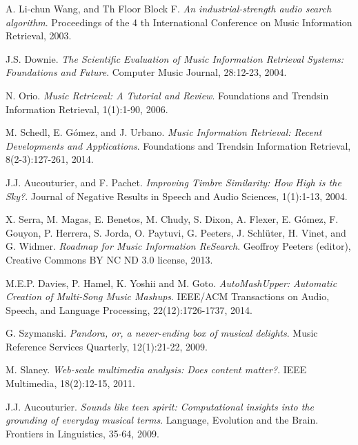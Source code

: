 \documentclass[11pt, oneside, openright]{Thesis} %
\begin{document}
\label{Bibliography}


\begin{thebibliography}{99}
A. Li-chun Wang, and Th Floor Block F. 
\textit{An industrial-strength audio search algorithm}. 
Proceedings of the 4 th International Conference on Music Information Retrieval, 2003.
 
J.S. Downie.
\textit{The Scientific Evaluation of Music Information Retrieval Systems: Foundations and Future}. 
Computer Music Journal, 28:12-23, 2004.
 
N. Orio.
\textit{Music Retrieval: A Tutorial and Review}. 
Foundations and Trends\textregistered in Information Retrieval, 1(1):1-90, 2006.

M. Schedl, E. Gómez, and J. Urbano.
\textit{Music Information Retrieval: Recent Developments and Applications}. 
Foundations and Trends\textregistered in Information Retrieval, 8(2-3):127-261, 2014.

J.J. Aucouturier, and F. Pachet.
\textit{Improving Timbre Similarity: How High is the Sky?}. 
Journal of Negative Results in Speech and Audio Sciences, 1(1):1-13, 2004.

X. Serra, M. Magas, E. Benetos, M. Chudy, S. Dixon, A. Flexer, E. Gómez, F. Gouyon, P. Herrera, S. Jorda, O. Paytuvi, G. Peeters, J. Schlüter, H. Vinet, and G. Widmer.
\textit{Roadmap for Music Information ReSearch}. 
Geoffroy Peeters (editor), Creative Commons BY NC ND 3.0 license, 2013.

M.E.P. Davies, P. Hamel, K. Yoshii and M. Goto.
\textit{AutoMashUpper: Automatic Creation of Multi-Song Music Mashups}. 
IEEE/ACM Transactions on Audio, Speech, and Language Processing, 22(12):1726-1737, 2014.

G. Szymanski.
\textit{Pandora, or, a never-ending box of musical delights}. 
Music Reference Services Quarterly, 12(1):21-22, 2009.

M. Slaney.
\textit{Web-scale multimedia analysis: Does content matter?}. 
IEEE Multimedia, 18(2):12-15, 2011.

J.J. Aucouturier.
\textit{Sounds like teen spirit: Computational insights into the grounding of everyday musical terms}. 
Language, Evolution and the Brain. Frontiers in Linguistics, 35-64, 2009.


\end{thebibliography}
\end{document}
